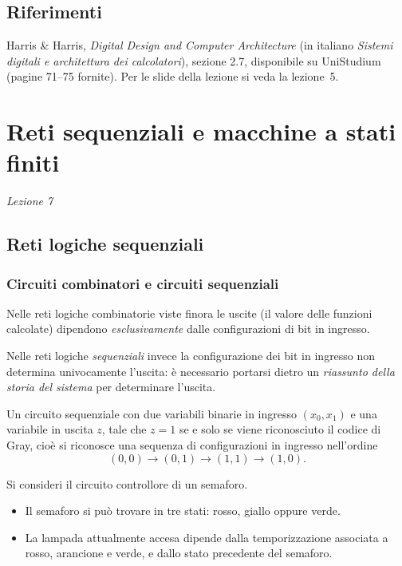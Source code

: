 \documentclass[11pt,a4paper]{article}
\begin{document}
\subsection{Riferimenti}

Harris \& Harris, \emph{Digital Design and Computer Architecture} (in italiano \emph{Sistemi digitali e architettura dei calcolatori}), sezione 2.7, disponibile su UniStudium (pagine 71--75 fornite). Per le slide della lezione si veda la lezione~5.

\section[Reti sequenziali e macchine a stati finiti (Lezione 7)]{Reti sequenziali e macchine a stati finiti}
\noindent\emph{Lezione 7}
\subsection{Reti logiche sequenziali}

\subsubsection{Circuiti combinatori e circuiti sequenziali}

Nelle reti logiche combinatorie viste finora le uscite (il valore delle funzioni calcolate) dipendono \emph{esclusivamente} dalle configurazioni di bit in ingresso.

Nelle reti logiche \emph{sequenziali} invece la configurazione dei bit in ingresso non determina univocamente l'uscita: è necessario portarsi dietro un \emph{riassunto della storia del sistema} per determinare l'uscita.

\begin{esempio}
Un circuito sequenziale con due variabili binarie in ingresso $(x_0, x_1)$ e una variabile in uscita $z$, tale che $z = 1$ se e solo se viene riconosciuto il codice di Gray, cioè si riconosce una sequenza di configurazioni in ingresso nell'ordine
\[
(0,0) \to (0,1) \to (1,1) \to (1,0).
\]
\end{esempio}

\begin{esempio}[Il semaforo]
Si consideri il circuito controllore di un semaforo.
\begin{itemize}
    \item Il semaforo si può trovare in tre stati: rosso, giallo oppure verde.
    \item La lampada attualmente accesa dipende dalla temporizzazione associata a rosso, arancione e verde, e dallo stato precedente del semaforo.
\end{itemize}
\end{esempio}
\end{document}
